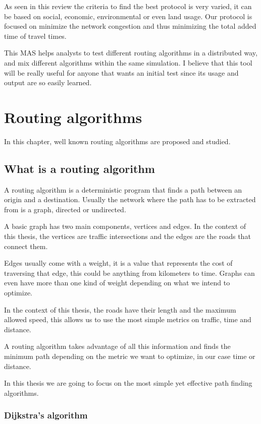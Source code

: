 As seen in this review \cite{perez_carrillo_montoya-torres_2014} the criteria to find the best protocol is very varied, it can be based on  social, economic, environmental or even land usage. Our protocol is focused on minimize the network congestion and thus minimizing the total added time of travel times.

This MAS helps analysts to test different routing algorithms in a distributed way, and mix different algorithms within the same simulation. I believe that this tool will be really useful for anyone that wants an initial test since its usage and output are so easily learned. 

\section{Routing algorithms}
\label{algorithms}

In this chapter, well known routing algorithms are proposed and studied.

\subsection{What is a routing algorithm}

A routing algorithm is a deterministic program that finds a path between an origin and a destination. Usually the network where the path has to be extracted from is a graph, directed or undirected.

A basic graph has two main components, vertices and edges. In the context of this thesis, the vertices are traffic intersections and the edges are the roads that connect them.

Edges usually come with a weight, it is a value that represents the cost of traversing that edge, this could be anything from kilometers to time. Graphs can even have more than one kind of weight depending on what we intend to optimize.

In the context of this thesis, the roads have their length and the maximum allowed speed, this allows us to use the most simple metrics on traffic, time and distance.

A routing algorithm takes advantage of all this information and finds the minimum path depending on the metric we want to optimize, in our case time or distance.

In this thesis we are going to focus on the most simple yet effective path finding algorithms.

\subsubsection{Dijkstra's algorithm}

